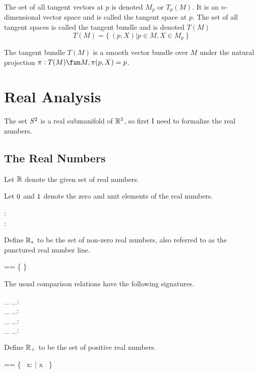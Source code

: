 \documentclass[11pt, oneside]{article}
\begin{document}
The set of all tangent vectors at $p$ is denoted $M_p$ or $T_p(M)$. 
It is an $n$-dimensional vector space and is called the tangent space at $p$.
The set of all tangent spaces is called the tangent bundle and is denoted $T(M)$
\begin{equation}
	T(M) = \{~ (p,X) | p \in M, X \in M_p ~\}
\end{equation}

The tangent bundle $T(M)$ is a smooth vector bundle over $M$ under the natural projection
$\pi: T(M) \fun M, \pi(p,X) = p$.

\section{Real Analysis}

The set $S^2$ is a real submanifold of $\mathbb{R}^3$, so first I need to formalize the real numbers.

\subsection{The Real Numbers}

Let $\mathbb{R}$ denote the given set of real numbers.
\begin{zed}
	[\R]
\end{zed}

Let $0$ and $1$ denote the zero and unit elements of the real numbers.
\begin{axdef}
	\zeroR: \R \\
	\oneR: \R
\end{axdef}

Define $\mathbb{R}_{*}$ to be the set of non-zero real numbers, 
also referred to as the punctured real number line.
\begin{zed}
	\Rnz == \R \setminus \{ \zeroR \}
\end{zed}

The usual comparison relations have the following signatures.
\begin{axdef}
	\_ \ltR \_: \R \rel \R \\
	\_ \leR \_: \R \rel \R \\
	\_ \gtR \_: \R \rel \R \\
	\_ \geR \_: \R \rel \R
\end{axdef}

Define $\mathbb{R}_{+}$ to be the set of positive real numbers.
\begin{zed}
	\Rpos == \{~ x: \R | x \gtR \zeroR ~\}
\end{zed}
\end{document}
